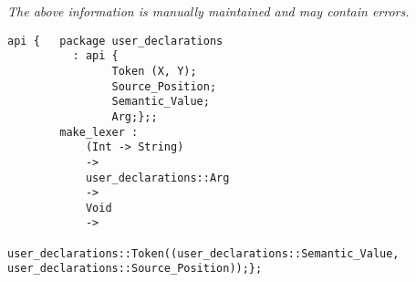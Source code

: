 \label{api:Arg\_Lexer}

{\tiny \it The above information is manually maintained and may contain errors.}
\begin{verbatim}
api {   package user_declarations
          : api {
                Token (X, Y);
                Source_Position;
                Semantic_Value;
                Arg;};;
        make_lexer :
            (Int -> String)
            ->
            user_declarations::Arg
            ->
            Void
            ->
            user_declarations::Token((user_declarations::Semantic_Value, user_declarations::Source_Position));};
\end{verbatim}
